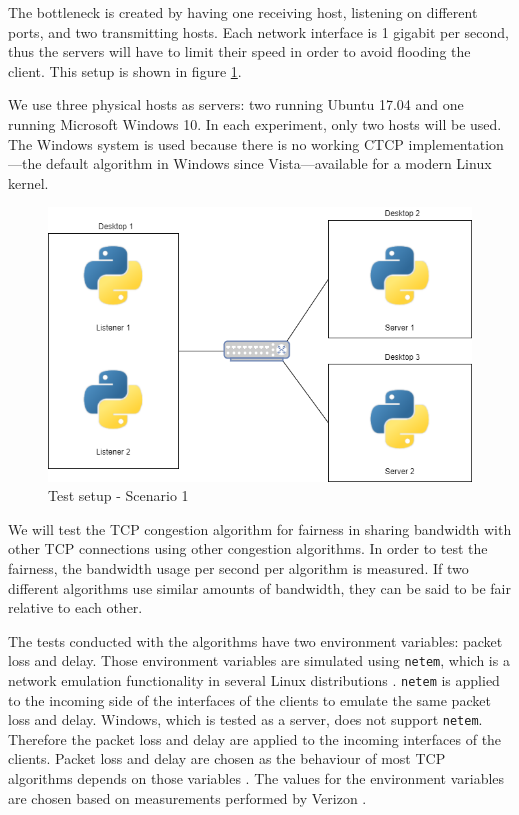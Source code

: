 \documentclass{article}
\begin{document}
The bottleneck is created by having one receiving host, listening on different
ports, and two transmitting hosts. Each network interface is 1 gigabit per
second, thus the servers will have to limit their speed in order to avoid
flooding the client. This setup is shown in figure \ref{fig:setup1}.

We use three physical hosts as servers: two running Ubuntu 17.04 and one
running Microsoft Windows 10. In each experiment, only two hosts will be used.
The Windows system is used because there is no working CTCP
implementation---the default algorithm in Windows since Vista---available for a
modern Linux kernel.

\begin{figure}[H]
	\centering
		\includegraphics[scale=0.5]{figs/setup2.png}
		\caption{Test setup - Scenario 1}
	\label{fig:setup1}
\end{figure}

We will test the TCP congestion algorithm for fairness in sharing bandwidth
with other TCP connections using other congestion algorithms. In order to test
the fairness, the bandwidth usage per second per algorithm is measured. If two
different algorithms use similar amounts of bandwidth, they can be said to be
fair relative to each other.

The tests conducted with the algorithms have two environment variables: packet loss and delay. Those environment variables are simulated using \texttt{netem}, which is a network emulation functionality in several Linux distributions \cite{linux-netem}. \texttt{netem} is applied to the incoming side of the interfaces of the clients to emulate the same packet loss and delay. Windows, which is tested as a server, does not support \texttt{netem}. Therefore the packet loss and delay are applied to the incoming interfaces of the clients. Packet loss and delay are chosen as the behaviour of most TCP algorithms depends on those variables \cite{bbr-congestion}\cite{dctcp-congestion}\cite{cubic-tcp-congestion}\cite{compound-tcp-congestion}\cite{bic-tcp-congestion}. The values for the environment variables are chosen based on measurements performed by Verizon \cite{verizon-latency}.
\end{document}
